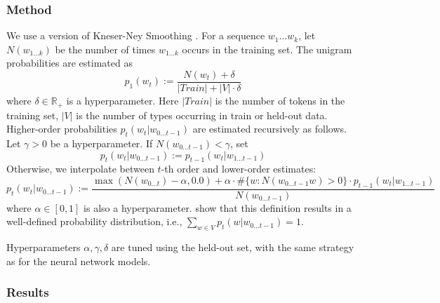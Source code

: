 \documentclass[11pt,letterpaper]{article}
\begin{document}
\subsubsection{Method}
We use a version of Kneser-Ney Smoothing \citep{kneser-improved-1995}.
For a sequence $w_1\dots w_k$, let $N(w_{1\dots k})$ be the number of times $w_{1\dots k}$ occurs in the training set.
The unigram probabilities are estimated as
\begin{equation}
	p_1(w_t) :=   \frac{N(w_t) + \delta}{|Train| + |V| \cdot \delta}
\end{equation}
where $\delta \in \mathbb{R}_+$ is a hyperparameter.
Here $|Train|$ is the number of tokens in the training set, $|V|$ is the number of types occurring in train or held-out data.
Higher-order probabilities $p_t(w_t|w_{0 \dots t-1})$ are estimated recursively as follows.
Let $\gamma > 0$ be a hyperparameter.
If $N(w_{0 \dots t-1}) < \gamma$, set
\begin{equation}
	p_t(w_t|w_{0 \dots t-1}) := p_{t-1}(w_t|w_{1\dots t-1})
\end{equation}
Otherwise, we interpolate between $t$-th order and lower-order estimates:
\begin{equation}
	p_t(w_t|w_{0 \dots t-1}) :=  \frac{\operatorname{max}(N(w_{0\dots t}) - \alpha, 0.0) + \alpha \cdot \#\{w : N(w_{0 \dots t-1}w) > 0\} \cdot p_{t-1}(w_t|w_{1\dots t-1})}{N(w_{0\dots t-1})}
\end{equation}
where $\alpha \in [0,1]$ is also a hyperparameter.
\citet{kneser-improved-1995} show that this definition results in a well-defined probability distribution, i.e., $\sum_{w \in V} p_t(w|w_{0 \dots t-1}) = 1$.

%
%
%
%


Hyperparameters $\alpha, \gamma, \delta$ are tuned using the held-out set, with the same strategy as for the neural network models.


\subsubsection{Results}
\end{document}
